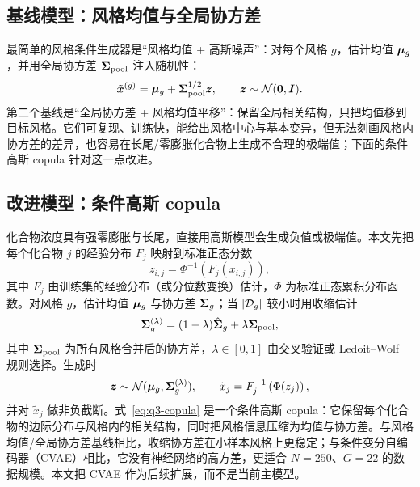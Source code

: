 \subsection{基线模型：风格均值与全局协方差}

最简单的风格条件生成器是“风格均值 + 高斯噪声”：对每个风格 $g$，估计均值 $\bm{\mu}_g$，并用全局协方差 $\bm{\Sigma}_{\mathrm{pool}}$ 注入随机性：
\begin{equation}
  \tilde{\bm{x}}^{(g)}=\bm{\mu}_g+\bm{\Sigma}_{\mathrm{pool}}^{1/2}\bm{z},\qquad
  \bm{z}\sim\mathcal{N}(\bm{0},\bm{I}).
  \label{eq:q3-mean-noise}
\end{equation}
第二个基线是“全局协方差 + 风格均值平移”：保留全局相关结构，只把均值移到目标风格。它们可复现、训练快，能给出风格中心与基本变异，但无法刻画风格内协方差的差异，也容易在长尾/零膨胀化合物上生成不合理的极端值；下面的条件高斯 copula 针对这一点改进。

\subsection{改进模型：条件高斯 copula}

化合物浓度具有强零膨胀与长尾，直接用高斯模型会生成负值或极端值。本文先把每个化合物 $j$ 的经验分布 $F_j$ 映射到标准正态分数
\begin{equation}
  z_{i,j}=\Phi^{-1}\left(F_j(x_{i,j})\right),
  \label{eq:q3-normal-score}
\end{equation}
其中 $F_j$ 由训练集的经验分布（或分位数变换）估计，$\Phi$ 为标准正态累积分布函数。对风格 $g$，估计均值 $\bm{\mu}_g$ 与协方差 $\bm{\Sigma}_g$；当 $\left\lvert \mathcal{D}_g \right\rvert$ 较小时用收缩估计
\begin{equation}
  \bm{\Sigma}_g^{(\lambda)}=(1-\lambda)\hat{\bm{\Sigma}}_g+\lambda\bm{\Sigma}_{\mathrm{pool}},
  \label{eq:q3-shrinkage}
\end{equation}
其中 $\bm{\Sigma}_{\mathrm{pool}}$ 为所有风格合并后的协方差，$\lambda\in[0,1]$ 由交叉验证或 Ledoit--Wolf 规则选择。生成时
\begin{equation}
  \bm{z}\sim\mathcal{N}(\bm{\mu}_g,\bm{\Sigma}_g^{(\lambda)}),\qquad
  \tilde{x}_j=F_j^{-1}\left(\Phi(z_j)\right),
  \label{eq:q3-copula}
\end{equation}
并对 $\tilde{x}_j$ 做非负截断。式~\eqref{eq:q3-copula} 是一个条件高斯 copula：它保留每个化合物的边际分布与风格内的相关结构，同时把风格信息压缩为均值与协方差。与风格均值/全局协方差基线相比，收缩协方差在小样本风格上更稳定；与条件变分自编码器（CVAE）相比，它没有神经网络的高方差，更适合 $N=250$、$G=22$ 的数据规模。本文把 CVAE 作为后续扩展，而不是当前主模型\citep{kingma2014auto,sohn2015learning}。

